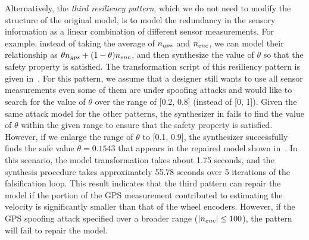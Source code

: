 Alternatively, the \emph{third resiliency pattern}, which we do not need to modify the structure of the original model, is to model the redundancy in the sensory information as a linear combination of different sensor measurements. For example, instead of taking the average of $n_{gps}$ and $n_{enc}$, we can model their relationship as $\theta n_{gps} + (1-\theta)n_{enc}$, and then synthesize the value of $\theta$ so that the safety property is satisfied. The transformation script of this resiliency pattern is given in~. For this pattern, we assume that a designer still wants to use all sensor measurements even some of them are under spoofing attacks and would like to search for the value of $\theta$ over the range of [0.2, 0.8] (instead of [0, 1]). Given the same attack model for the other patterns, the synthesizer in \toolreaffirm fails to find the value of $\theta$ within the given range to ensure that the safety property is satisfied. However, if we enlarge the range of $\theta$ to [0.1, 0.9], the synthesizer successfully finds the safe value $\theta = 0.1543$ that appears in the repaired model shown in~. In this scenario, the model transformation takes about 1.75 seconds, and the synthesis procedure takes approximately 55.78 seconds over 5 iterations of the falsification loop.
%
This result indicates that the third pattern can repair the model if the portion of the GPS measurement contributed to estimating the velocity is significantly smaller than that of the wheel encoders. However, if the GPS spoofing attack specified over a broader range (\eg $|n_{enc}| \leq 100$), the pattern will fail to repair the model.









